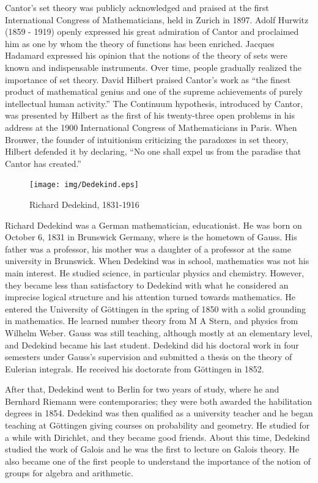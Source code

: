 \documentclass{article}
\begin{document}
Cantor's set theory was publicly acknowledged and praised at the first International Congress of Mathematicians, held in Zurich in 1897. Adolf Hurwitz (1859 - 1919) openly expressed his great admiration of Cantor and proclaimed him as one by whom the theory of functions has been enriched. Jacques Hadamard expressed his opinion that the notions of the theory of sets were known and indispensable instruments. Over time, people gradually realized the importance of set theory. David Hilbert praised Cantor's work as ``the finest product of mathematical genius and one of the supreme achievements of purely intellectual human activity.'' The Continuum hypothesis, introduced by Cantor, was presented by Hilbert as the first of his twenty-three open problems in his address at the 1900 International Congress of Mathematicians in Paris. When Brouwer, the founder of intuitionism criticizing the paradoxes in set theory, Hilbert defended it by declaring, ``No one shall expel us from the paradise that Cantor has created.''

\begin{figure}
 \centering
 \texttt{[image: img/Dedekind.eps]}
 \captionsetup{labelformat=empty}
 \caption{Richard Dedekind, 1831-1916}
 \label{fig:Dedekind}
\end{figure}

Richard Dedekind was a German mathematician, educationist. He was born on October 6, 1831 in Brunswick Germany, where is the hometown of Gauss. His father was a professor, his mother was a daughter of a professor at the same university in Brunswick. When Dedekind was in school, mathematics was not his main interest. He studied science, in particular physics and chemistry. However, they became less than satisfactory to Dedekind with what he considered an imprecise logical structure and his attention turned towards mathematics. He entered the University of Göttingen in the spring of 1850 with a solid grounding in mathematics. He learned number theory from M A Stern, and physics from Wilhelm Weber. Gauss was still teaching, although mostly at an elementary level, and Dedekind became his last student. Dedekind did his doctoral work in four semesters under Gauss's supervision and submitted a thesis on the theory of Eulerian integrals. He received his doctorate from Göttingen in 1852.

After that, Dedekind went to Berlin for two years of study, where he and Bernhard Riemann were contemporaries; they were both awarded the habilitation degrees in 1854. Dedekind was then qualified as a university teacher and he began teaching at Göttingen giving courses on probability and geometry. He studied for a while with Dirichlet, and they became good friends. About this time, Dedekind studied the work of Galois and he was the first to lecture on Galois theory. He also became one of the first people to understand the importance of the notion of groups for algebra and arithmetic.
\end{document}

